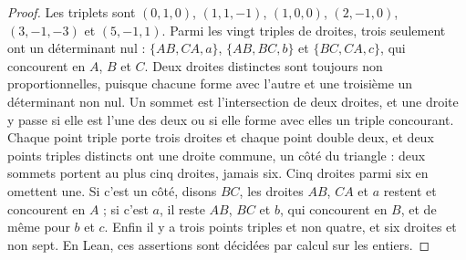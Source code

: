 \begin{proof}
Les triplets sont $(0, 1, 0)$, $(1, 1, -1)$, $(1, 0, 0)$, $(2, -1, 0)$, $(3, -1, -3)$ et $(5, -1, 1)$. Parmi les vingt triples de droites, trois seulement ont un déterminant nul : $\{AB, CA, a\}$, $\{AB, BC, b\}$ et $\{BC, CA, c\}$, qui concourent en $A$, $B$ et $C$. Deux droites distinctes sont toujours non proportionnelles, puisque chacune forme avec l'autre et une troisième un déterminant non nul. Un sommet est l'intersection de deux droites, et une droite y passe si elle est l'une des deux ou si elle forme avec elles un triple concourant. Chaque point triple porte trois droites et chaque point double deux, et deux points triples distincts ont une droite commune, un côté du triangle : deux sommets portent au plus cinq droites, jamais six. Cinq droites parmi six en omettent une. Si c'est un côté, disons $BC$, les droites $AB$, $CA$ et $a$ restent et concourent en $A$ ; si c'est $a$, il reste $AB$, $BC$ et $b$, qui concourent en $B$, et de même pour $b$ et $c$. Enfin il y a trois points triples et non quatre, et six droites et non sept. En Lean, ces assertions sont décidées par calcul sur les entiers.
\end{proof}

